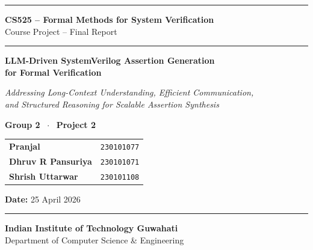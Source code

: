 \documentclass[12pt,a4paper]{article}
\begin{document}

\begin{titlepage}
  \centering
  \vspace*{0.4cm}

  {\color{iitgblue}\rule{\linewidth}{2pt}}
  \vspace{0.3cm}

  {\Large\bfseries\color{iitgblue}
    CS525 -- Formal Methods for System Verification}\\[0.2cm]
  {\normalsize Course Project -- Final Report}

  \vspace{0.4cm}
  {\color{iitgblue}\rule{\linewidth}{0.2pt}}
  \vspace{0.6cm}

  {\LARGE\bfseries\color{iitgblue}
    LLM-Driven SystemVerilog Assertion Generation\\[0.2cm]
    for Formal Verification}

  \vspace{0.4cm}
  {\large\color{darkgray}\itshape
    Addressing Long-Context Understanding, Efficient Communication,\\
    and Structured Reasoning for Scalable Assertion Synthesis}

  \vspace{1.2cm}

    {\bfseries\color{iitgblue} Group 2 $\;\cdot\;$ Project 2}\\[6pt]
    \begin{tabular}{lc}
      \bfseries Pranjal           & \texttt{230101077} \\[2pt]
      \bfseries Dhruv R Pansuriya & \texttt{230101071} \\[2pt]
      \bfseries Shrish Uttarwar   & \texttt{230101108} \\
    \end{tabular}

  \vspace{4.0cm}

  {\normalsize\color{darkgray}
    \textbf{Date:} 25 April 2026}
    
  \vspace{0.4cm}
  {\color{iitgblue}\rule{\linewidth}{0.8pt}}
  \vspace{0.6cm}

  {\Large\bfseries\color{iitgblue}
    Indian Institute of Technology Guwahati}\\[0.2cm]
  {\normalsize Department of Computer Science \& Engineering}

\end{titlepage}
\end{document}
